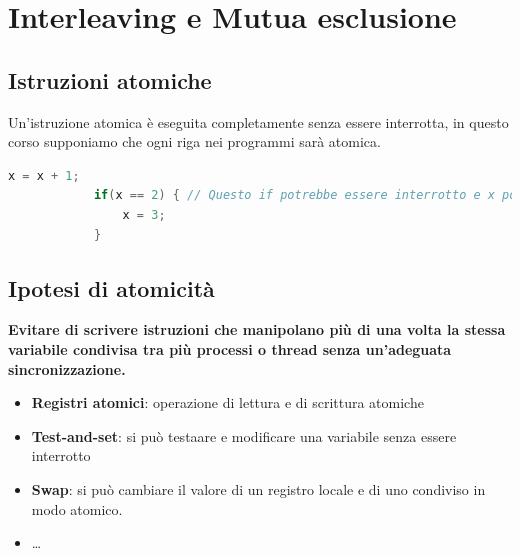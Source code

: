 \documentclass[12pt, a4paper]{report}
\begin{document}
    \chapter{Interleaving e Mutua esclusione}
        \section{Istruzioni atomiche}
            Un'istruzione atomica è eseguita completamente senza essere interrotta, in questo corso supponiamo che ogni riga nei programmi sarà atomica.
            \begin{lstlisting}[language=C]
            x = x + 1;
            if(x == 2) { // Questo if potrebbe essere interrotto e x potrebbe cambiare
                x = 3;
            }
            \end{lstlisting}
        \section{Ipotesi di atomicità}
            \textbf{Evitare di scrivere istruzioni che manipolano più di una volta la stessa variabile condivisa tra più processi o thread senza un'adeguata sincronizzazione.}
            \begin{itemize}
                \item \textbf{Registri atomici}: operazione di lettura e di scrittura atomiche
                \item \textbf{Test-and-set}: si può testaare e modificare una variabile senza essere interrotto
                \item \textbf{Swap}: si può cambiare il valore di un registro locale e di uno condiviso in modo atomico.
                \item \ldots
            \end{itemize}
\end{document}
